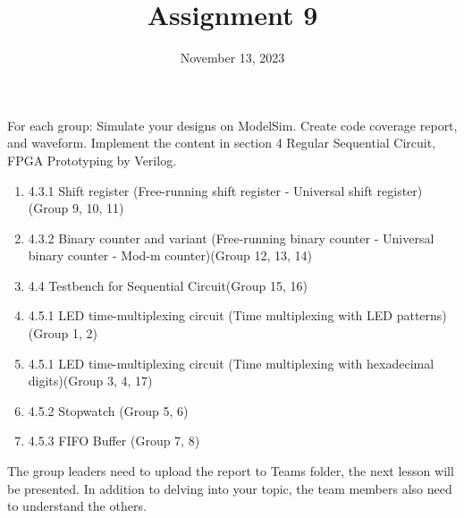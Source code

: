 \documentclass{vhdl-assignment}
\title{Assignment 9}
\date{November 13, 2023}
\begin{document}
\maketitle
\thispagestyle{fancy}

For each group: Simulate your designs on ModelSim. Create code coverage report, and waveform.
Implement the content in section 4 Regular Sequential Circuit, FPGA Prototyping by Verilog.

\begin{enumerate}
    \item 4.3.1 Shift register (Free-running shift register - Universal shift register) (Group 9, 10, 11)
    \item 4.3.2 Binary counter and variant (Free-running binary counter - Universal binary counter - Mod-m counter)(Group 12, 13, 14)
    \item 4.4 Testbench for Sequential Circuit(Group 15, 16)
    \item 4.5.1 LED time-multiplexing circuit (Time multiplexing with LED patterns)(Group 1, 2)
    \item 4.5.1 LED time-multiplexing circuit (Time multiplexing with hexadecimal digits)(Group 3, 4, 17)
    \item 4.5.2 Stopwatch (Group 5, 6)
    \item 4.5.3 FIFO Buffer (Group 7, 8)
\end{enumerate}

The group leaders need to upload the report to Teams folder, the next lesson will be presented.
In addition to delving into your topic, the team members also need to understand the others.
\end{document}
